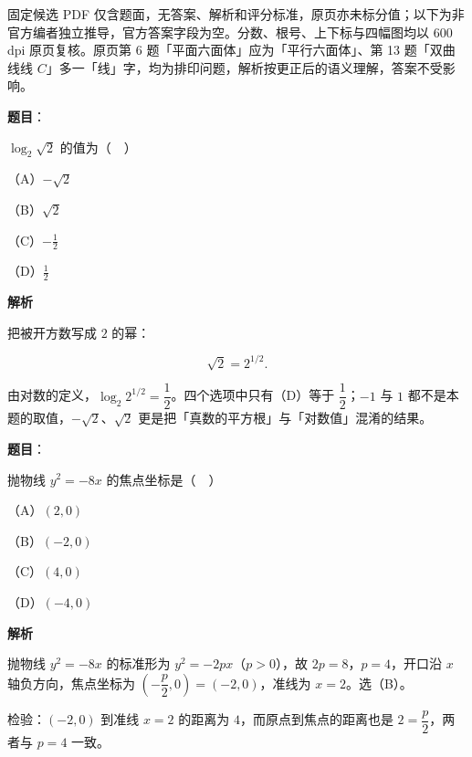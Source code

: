 

\begin{gktip}
固定候选 PDF 仅含题面，无答案、解析和评分标准，原页亦未标分值；以下为非官方编者独立推导，官方答案字段为空。分数、根号、上下标与四幅图均以 600 dpi 原页复核。原页第 6 题「平面六面体」应为「平行六面体」、第 13 题「双曲线线 $C$」多一「线」字，均为排印问题，解析按更正后的语义理解，答案不受影响。
\end{gktip}

\begin{answer}

\textbf{题目}：

$\log_2\sqrt2$ 的值为（　）

（A）$-\sqrt2$

（B）$\sqrt2$

（C）$-\frac12$

（D）$\frac12$

\textbf{解析}

把被开方数写成 $2$ 的幂：

\nopagebreak[4]
\[\sqrt2=2^{1/2}.\]

由对数的定义，$\log_2 2^{1/2}=\dfrac12$。四个选项中只有（D）等于 $\dfrac12$；$-1$ 与 $1$ 都不是本题的取值，$-\sqrt2$、$\sqrt2$ 更是把「真数的平方根」与「对数值」混淆的结果。


\end{answer}
\begin{answer}

\textbf{题目}：

抛物线 $y^2=-8x$ 的焦点坐标是（　）

（A）$(2,0)$

（B）$(-2,0)$

（C）$(4,0)$

（D）$(-4,0)$

\textbf{解析}

抛物线 $y^2=-8x$ 的标准形为 $y^2=-2px$（$p>0$），故 $2p=8$，$p=4$，开口沿 $x$ 轴负方向，焦点坐标为 $\left(-\dfrac p2,0\right)=(-2,0)$，准线为 $x=2$。选（B）。

检验：$(-2,0)$ 到准线 $x=2$ 的距离为 $4$，而原点到焦点的距离也是 $2=\dfrac p2$，两者与 $p=4$ 一致。


\end{answer}
